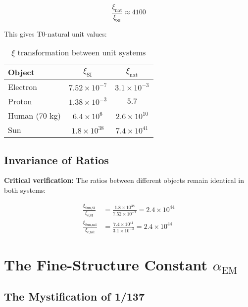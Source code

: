 \documentclass[12pt,a4paper]{article}
\newcommand{\xipar}{\xi}
\begin{document}
	$$\frac{\xipar_{\text{nat}}}{\xipar_{\text{SI}}} \approx 4100$$
	
	This gives T0-natural unit values:
	
	\begin{table}[htbp]
		\centering
		\begin{tabular}{lcc}
			\toprule
			\textbf{Object} & \textbf{$\xipar_{\text{SI}}$} & \textbf{$\xipar_{\text{nat}}$} \\
			\midrule
			Electron & $7.52 \times 10^{-7}$ & $3.1 \times 10^{-3}$ \\
			Proton & $1.38 \times 10^{-3}$ & $5.7$ \\
			Human (70 kg) & $6.4 \times 10^{6}$ & $2.6 \times 10^{10}$ \\
			Sun & $1.8 \times 10^{38}$ & $7.4 \times 10^{41}$ \\
			\bottomrule
		\end{tabular}
		\caption{$\xipar$ transformation between unit systems}
		\label{tab:xi_transformation}
	\end{table}
	
	\subsection{Invariance of Ratios}
	\label{subsec:xi_ratio_invariance}
	
	\textbf{Critical verification:} The ratios between different objects remain identical in both systems:
	
	\begin{align}
		\frac{\xipar_{\text{Sun},\text{SI}}}{\xipar_{\text{e},\text{SI}}} &= \frac{1.8 \times 10^{38}}{7.52 \times 10^{-7}} = 2.4 \times 10^{44} \\
		\frac{\xipar_{\text{Sun},\text{nat}}}{\xipar_{\text{e},\text{nat}}} &= \frac{7.4 \times 10^{41}}{3.1 \times 10^{-3}} = 2.4 \times 10^{44}
	\end{align}
	
	
\section{The Fine-Structure Constant $\alpha_{\text{EM}}$}
\label{sec:alpha_em}

\subsection{The Mystification of 1/137}
\label{subsec:alpha_mystification}
\end{document}

